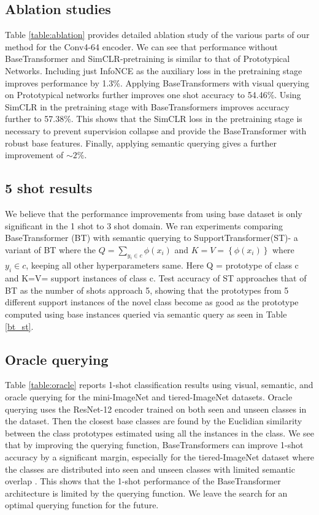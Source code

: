\documentclass{bmvc2k}
\begin{document}
\subsection{Ablation studies}
Table \ref{table:ablation} provides detailed ablation study of the various parts of our method for the Conv4-64 encoder. We can see that performance without BaseTransformer and SimCLR-pretraining is similar to that of Prototypical Networks. Including just InfoNCE as the auxiliary loss in the pretraining stage improves performance by 1.3\%. Applying BaseTransformers with visual querying on Prototypical networks further improves one shot accuracy to 54.46\%. Using SimCLR in the pretraining stage with BaseTransformers improves accuracy further to 57.38\%. This shows that the SimCLR loss in the pretraining stage is necessary to prevent supervision collapse and provide the BaseTransformer with robust base features. Finally, applying semantic querying gives a further improvement of $\sim 2\%$.

\subsection{5 shot results}\label{sec:5shot}
We believe that the performance improvements from using base dataset is only significant in the 1 shot to 3 shot domain. We ran experiments comparing BaseTransformer (BT) with semantic querying to SupportTransformer(ST)- a variant of BT where the \(Q=\sum_{y_{i}\in c}^{} \phi\left ( x_{i} \right )\) and \(K = V =\left \{ \phi(x_{i}) \right \}\)  where \(y_{i} \in c\), keeping all other hyperparameters same. Here Q = prototype of class c and K=V= support instances of class c.
Test accuracy of ST approaches that of BT as the number of shots approach 5, showing that the prototypes from 5 different support instances of the novel class become as good as the prototype computed using base instances queried via semantic query as seen in Table \ref{bt_st}.

\subsection{Oracle querying}\label{sec:oracle_q}
Table \ref{table:oracle} reports 1-shot classification results using visual, semantic, and oracle querying for the mini-ImageNet and tiered-ImageNet datasets. Oracle querying uses the ResNet-12 encoder trained on both seen and unseen classes in the dataset. Then the closest base classes are found by the Euclidian similarity between the class prototypes estimated using all the instances in the class. We see that by improving the querying function, BaseTransformers can improve 1-shot accuracy by a significant margin, especially for the tiered-ImageNet dataset where the classes are distributed into seen and unseen classes with limited semantic overlap \cite{oreshkin2018tadam}. This shows that the 1-shot performance of the BaseTransformer architecture is limited by the querying function. We leave the search for an optimal querying function for the future.
\end{document}
